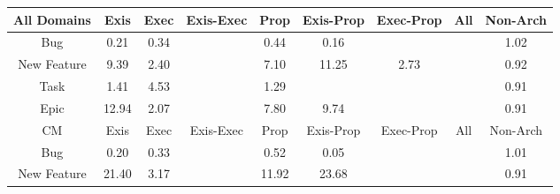 \begin{tabular}{|c||c|c|c|c|c|c|c|c|}
\hline
All Domains & Exis & Exec & Exis-Exec & Prop & Exis-Prop & Exec-Prop & All & Non-Arch \\ 
\hline
Bug & \cellcolor[rgb]{0.7858254070362408,0.2522402599715401,0.30410371323382485} 0.21 & \cellcolor[rgb]{0.8065172935387255,0.35018185608330027,0.3234161406361437} 0.34 &  & \cellcolor[rgb]{0.8221406213225351,0.4241322742599992,0.33799791323436607} 0.44 & \cellcolor[rgb]{0.7779642876666946,0.21503096162235402,0.2967666684889149} 0.16 &  &  & \cellcolor[rgb]{0.9099194416644111,0.8399618407884052,0.42} 1.02 \\ 
\hline
New Feature & \cellcolor[rgb]{0.8767551936768481,0.8242524601627175,0.42} 9.39 & \cellcolor[rgb]{0.9044595007545194,0.8373755529889827,0.42} 2.40 &  & \cellcolor[rgb]{0.8858557859961825,0.8285632670508232,0.41999999999999993} 7.10 & \cellcolor[rgb]{0.8693936646664526,0.8207654201051617,0.42} 11.25 & \cellcolor[rgb]{0.9031424484963959,0.8367516861298717,0.42} 2.73 &  & \cellcolor[rgb]{0.8968170449859705,0.7776006796002599,0.40769590865357236} 0.92 \\ 
\hline
Task & \cellcolor[rgb]{0.9083947299774515,0.8392396089366875,0.42} 1.41 & \cellcolor[rgb]{0.8960101013692512,0.8333732059117505,0.41999999999999993} 4.53 &  & \cellcolor[rgb]{0.9088546619040446,0.8394574714282317,0.42} 1.29 &  &  &  & \cellcolor[rgb]{0.8966116997044546,0.7766287119344185,0.40750425305749094} 0.91 \\ 
\hline
Epic & \cellcolor[rgb]{0.8626941180104278,0.8175919506365185,0.42000000000000004} 12.94 & \cellcolor[rgb]{0.9057670705829888,0.8379949281708893,0.42} 2.07 &  & \cellcolor[rgb]{0.8830598047342287,0.8272388548741082,0.42} 7.80 & \cellcolor[rgb]{0.8753699364082221,0.8235962856670525,0.41999999999999993} 9.74 &  &  & \cellcolor[rgb]{0.8957837021108164,0.7727095233245305,0.4067314553034286} 0.91 \\ 
\hline
\hline
CM & Exis & Exec & Exis-Exec & Prop & Exis-Prop & Exec-Prop & All & Non-Arch \\ 
\hline
Bug & \cellcolor[rgb]{0.7849888280411813,0.2482804527282581,0.3033229061717692} 0.20 & \cellcolor[rgb]{0.8049246127335035,0.34264316693858266,0.3219296385512698} 0.33 &  & \cellcolor[rgb]{0.8354359842562191,0.48706365881277025,0.3504069186391378} 0.52 & \cellcolor[rgb]{0.7608527991319083,0.1340365825576993,0.2807959458564478} 0.05 &  &  & \cellcolor[rgb]{0.9099482974985507,0.8399755093414186,0.42} 1.01 \\ 
\hline
New Feature & \cellcolor[rgb]{0.8292171708065668,0.8017344493294263,0.41999999999999993} 21.40 & \cellcolor[rgb]{0.9013935132522874,0.8359232431195045,0.42} 3.17 &  & \cellcolor[rgb]{0.8667642685951462,0.819519916702964,0.42} 11.92 & \cellcolor[rgb]{0.8201624273156638,0.7974453603074197,0.42} 23.68 &  &  & \cellcolor[rgb]{0.8963553819089128,0.7754154743688539,0.40726502311498525} 0.91 \\ 

\end{tabular}
